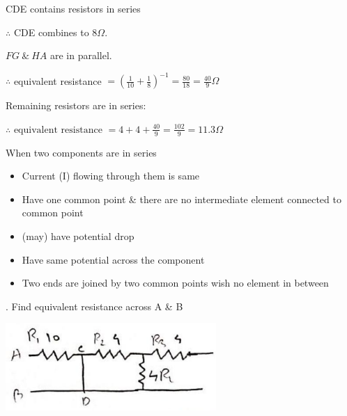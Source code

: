 \documentclass[12pt, a4paper]{article}
\newcommand{\figwidth}{8cm}
\begin{document}
\ans


CDE contains resistors in series

$\therefore$ CDE combines to $8 \Omega$.

\bigskip

$FG\ \&\ HA$ are in parallel.

$\therefore$ equivalent resistance $=\left(\frac{1}{10}+\frac{1}{8}\right)^{-1}=\frac{80}{18}=\frac{40}{9} \Omega$

\bigskip

Remaining resistors are in series:

$\therefore \text { equivalent resistance }=4+4+\frac{40}{9}=\frac{102}{9} = 11.3\Omega$


When two components are in series

\begin{itemize}
	\item Current (I) flowing through them is same
	\item Have one common point \& there are no intermediate element connected to common point
	\item (may) have potential drop
\end{itemize}


\begin{itemize}
	\item Have same potential across the component
	\item Two ends are joined by two common points wish no element in between
\end{itemize}
. Find equivalent resistance across A \& B

\begin{center}
	\includegraphics[max width=\figwidth]{2024_06_15_f9b8f5fbbfa74e15de4eg-2(4)}
\end{center}
\end{document}
